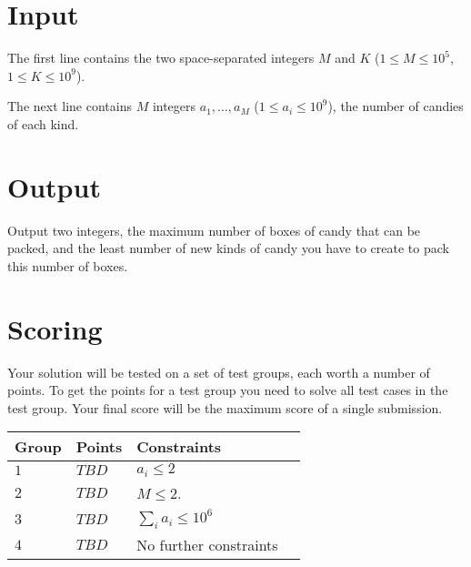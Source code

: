 \section*{Input}
The first line contains the two space-separated integers $M$ and $K$ ($1 \le M \le 10^5$, $1 \le K \le 10^9$).

The next line contains $M$ integers $a_1, \dots, a_M$ ($1 \le a_i \le 10^9$), the number of candies of each kind.

\section*{Output}
Output two integers, the maximum number of boxes of candy that can be packed, and the least number of new kinds of candy you have to create to pack this number of boxes.

\section*{Scoring}
Your solution will be tested on a set of test groups, each worth a number of points.
To get the points for a test group you need to solve all test cases in the test group.
Your final score will be the maximum score of a single submission.

\noindent
\begin{tabular}{| l | l | l | l |}
  \hline
  Group & Points & Constraints \\ \hline
  $1$    & $TBD$         & $a_i \le 2$ \\ \hline
  $2$    & $TBD$         & $M \le 2$. \\ \hline
  $3$    & $TBD$         & $\sum_i{a_i} \le 10^6$\\ \hline
  $4$    & $TBD$         & No further constraints\\ \hline
\end{tabular}
